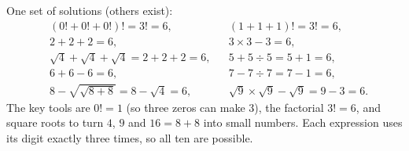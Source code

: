 One set of solutions (others exist):
\[
\begin{aligned}
&(0!+0!+0!)!=3!=6, &&(1+1+1)!=3!=6,\\
&2+2+2=6, &&3\times3-3=6,\\
&\sqrt4+\sqrt4+\sqrt4=2+2+2=6, &&5+5\div5=5+1=6,\\
&6+6-6=6, &&7-7\div7=7-1=6,\\
&8-\sqrt{\sqrt{8+8}}=8-\sqrt4=6, &&\sqrt9\times\sqrt9-\sqrt9=9-3=6.
\end{aligned}
\]
The key tools are $0!=1$ (so three zeros can make $3$), the factorial $3!=6$, and square roots to turn $4$, $9$ and $16=8+8$ into small numbers. Each expression uses its digit exactly three times, so all ten are possible.
